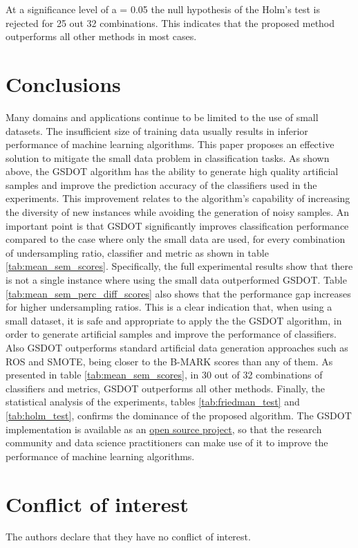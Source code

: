 \documentclass[10pt,letterpaper]{article}
\begin{document}
At a significance level of a = 0.05 the null hypothesis of the Holm's test is
rejected for 25 out 32 combinations. This indicates that the proposed method
outperforms all other methods in most cases.

\section{Conclusions}
\label{conclusions}

Many domains and applications continue to be limited to the use of small datasets. The insufficient size of training data usually results in inferior performance of machine learning algorithms. This paper proposes an effective solution to mitigate the small data problem in classification tasks. As shown above, the GSDOT algorithm has the ability to generate high quality artificial samples and improve the prediction accuracy of the classifiers used in the experiments. This improvement relates to the algorithm's capability of increasing the diversity of new instances while avoiding the generation of noisy samples. An important point is that GSDOT significantly improves classification performance compared to the case where only the small data are used, for every combination of undersampling ratio, classifier and metric as shown in table \ref{tab:mean_sem_scores}. Specifically, the full experimental results show that there is not a single instance where using the small data outperformed GSDOT. Table \ref{tab:mean_sem_perc_diff_scores} also shows that the performance gap increases for higher undersampling ratios. This is a clear indication that, when using a small dataset, it is safe and appropriate to apply the the GSDOT algorithm, in order to generate artificial samples and improve the performance of classifiers. Also GSDOT outperforms standard artificial data generation approaches such as ROS and SMOTE, being closer to the B-MARK scores than any of them. As presented in table \ref{tab:mean_sem_scores}, in 30 out of 32 combinations of classifiers and metrics, GSDOT outperforms all other methods. Finally, the statistical analysis of the experiments, tables \ref{tab:friedman_test} and \ref{tab:holm_test}, confirms the dominance of the proposed algorithm. The GSDOT implementation is available as an \href{https://geometric-smote.readthedocs.io/en/latest/?badge=latest}{open source project}, so that the research community and data science practitioners can make use of it to improve the performance of machine learning algorithms.

\section*{Conflict of interest}
The authors declare that they have no conflict of interest.

\nolinenumbers


\end{document}
